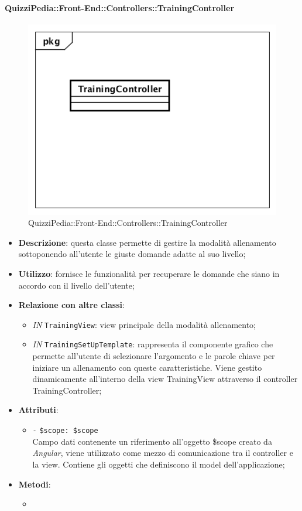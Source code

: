 \paragraph{QuizziPedia::Front-End::Controllers::TrainingController}
\begin{figure}
	\centering
	\includegraphics[scale=0.45]{UML/Classi/Front-End/QuizziPedia_Front-end_Controller_TrainingController.png}
	\caption{QuizziPedia::Front-End::Controllers::TrainingController}
\end{figure}
\begin{itemize}
	\item \textbf{Descrizione}: questa classe permette di gestire la modalità allenamento sottoponendo all'utente le giuste domande adatte al suo livello;
	\item \textbf{Utilizzo}: fornisce le funzionalità per recuperare le domande che siano in accordo con il livello dell'utente;
	\item \textbf{Relazione con altre classi}:
	\begin{itemize}
		\item \textit{IN} \texttt{TrainingView}: view principale della modalità allenamento;
		\item \textit{IN} \texttt{TrainingSetUpTemplate}: rappresenta il componente grafico che permette all'utente di selezionare l'argomento e le parole chiave per iniziare un allenamento con queste caratteristiche. Viene gestito dinamicamente all'interno della view TrainingView attraverso il controller TrainingController;
	\end{itemize}
	\item \textbf{Attributi}:
	\begin{itemize}
		\item \texttt{-} \texttt{\$scope: \$scope} \\
		Campo dati contenente un riferimento all’oggetto \$scope creato da \textit{Angular}, viene utilizzato come mezzo di comunicazione tra il controller e la view. Contiene gli oggetti che definiscono il model dell’applicazione;
	\end{itemize}
	\item \textbf{Metodi}:
	\begin{itemize}
		\item 
	\end{itemize}
\end{itemize}

